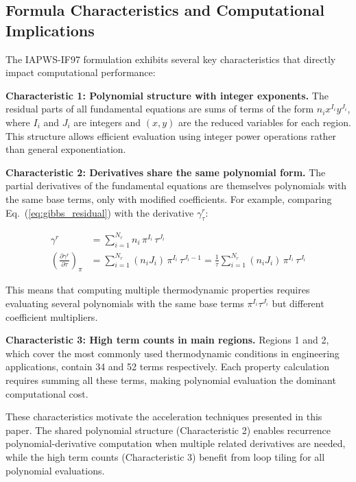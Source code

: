 \documentclass{article}
\begin{document}
\subsection{Formula Characteristics and Computational Implications}

The IAPWS-IF97 formulation exhibits several key characteristics that directly impact computational performance:

\textbf{Characteristic 1: Polynomial structure with integer exponents.} The residual parts of all fundamental equations are sums of terms of the form $n_i x^{I_i} y^{J_i}$, where $I_i$ and $J_i$ are integers and $(x, y)$ are the reduced variables for each region. This structure allows efficient evaluation using integer power operations rather than general exponentiation.

\textbf{Characteristic 2: Derivatives share the same polynomial form.} The partial derivatives of the fundamental equations are themselves polynomials with the same base terms, only with modified coefficients. For example, comparing Eq.~(\ref{eq:gibbs_residual}) with the derivative $\gamma^r_\tau$:

\begin{align}
\gamma^r &= \sum_{i=1}^{N_r} n_i \, \pi^{I_i} \, \tau^{J_i} \\
\left( \frac{\partial \gamma^r}{\partial \tau} \right)_\pi &= \sum_{i=1}^{N_r} (n_i J_i) \, \pi^{I_i} \, \tau^{J_i - 1} =\frac{1}{\tau} \sum_{i=1}^{N_r} (n_i J_i) \, \pi^{I_i} \, \tau^{J_i}
\end{align}

This means that computing multiple thermodynamic properties requires evaluating several polynomials with the same base terms $\pi^{I_i} \tau^{J_i}$ but different coefficient multipliers.

\textbf{Characteristic 3: High term counts in main regions.} Regions 1 and 2, which cover the most commonly used thermodynamic conditions in engineering applications, contain 34 and 52 terms respectively. Each property calculation requires summing all these terms, making polynomial evaluation the dominant computational cost.

These characteristics motivate the acceleration techniques presented in this paper. The shared polynomial structure (Characteristic 2) enables recurrence polynomial-derivative computation when multiple related derivatives are needed, while the high term counts (Characteristic 3) benefit from loop tiling for all polynomial evaluations.
\end{document}
